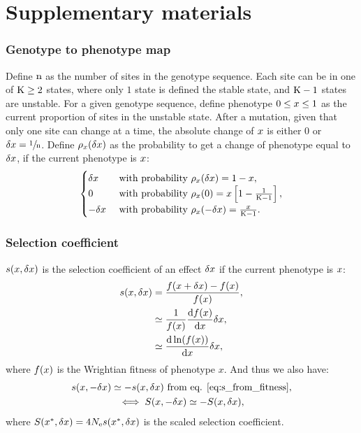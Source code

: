 \documentclass{article}
\begin{document}
\part*{Supplementary materials}

\section*{Genotype to phenotype map}
Define $\text{n}$ as the number of sites in the genotype sequence.
Each site can be in one of $\text{K} \geq 2$ states, where only $1$ state is defined the stable state, and $\text{K} - 1$ states are unstable.
For a given genotype sequence, define phenotype $0 \leq x \leq 1$ as the current proportion of sites in the unstable state.
After a mutation, given that only one site can change at a time, the absolute change of $x$ is either $0$ or $\delta x=\sfrac{1}{\text{n}}$.
Define $\rho_{x}(\delta x)$ as the probability to get a change of phenotype equal to $\delta x$, if the current phenotype is $x$:\\
\begin{gather}
\begin{cases}
\delta x &\text{ with probability } \rho_{x}(\delta x) = 1-x, \\
0 &\text{ with probability } \rho_{x}(0) = x \left[1 - \frac{1}{\text{K} - 1}\right], \\
-\delta x &\text{ with probability } \rho_{x}(-\delta x) = \frac{x}{\text{K} - 1}.\\
\end{cases} \label{eq:proba}
\end{gather}

\section*{Selection coefficient}
$s(x, \delta x)$ is the selection coefficient of an effect $\delta x$ if the current phenotype is $x$:
\begin{align}
s(x, \delta x) &= \frac{f(x + \delta x) - f(x)}{f( x)}, \\
 &\simeq \frac{1}{f(x)}\frac{\mathrm{d} f( x)}{\mathrm{d} x} \delta x, \\
 &\simeq \frac{\mathrm{d} \ln (f(x))}{\mathrm{d} x} \delta x, \label{eq:s_from_fitness}
\end{align}
where $f( x)$ is the Wrightian fitness of phenotype $x$. And thus we also have:
\begin{gather}
s(x, -\delta x) \simeq - s(x, \delta x) \text{ from eq. \ref{eq:s_from_fitness}} \label{eq:s_minus_deltax}, \\
\iff S(x, -\delta x) \simeq - S(x, \delta x), \label{eq:S_minus_deltax}
\end{gather}
where $S(x^{*}, \delta x) = 4N_{\mathrm{e}} s (x^{*}, \delta x)$ is the scaled selection coefficient.
\end{document}
